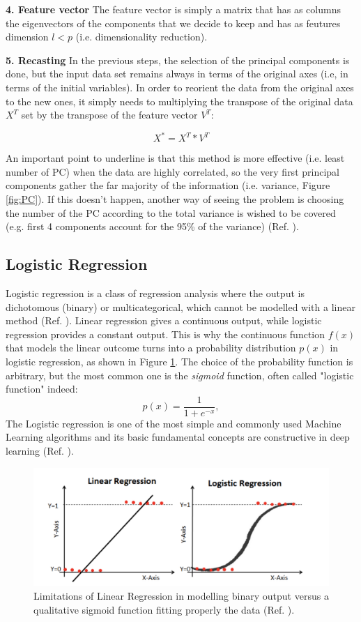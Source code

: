 \documentclass[english,notitlepage,reprint,nofootinbib]{revtex4-1}  %
\begin{document}
\textbf{4. Feature vector}
The feature vector is simply a matrix that has as columns the eigenvectors of the components that we decide to keep and has as feutures dimension $l < p$ (i.e. dimensionality reduction).

\textbf{5. Recasting}
In the previous steps, the selection of the principal components is done, but the input data set remains always in terms of the original axes (i.e, in terms of the initial variables). In order to reorient the data from the original axes to the new ones, it simply needs to multiplying the transpose of the original data $X^{T}$ set by the transpose of the feature vector $V^{T}$:

\begin{equation}
    X^{*} = X^{T} * V^{T}
\end{equation}

An important point to underline is that this method is more effective (i.e. least number of PC) when the data are highly correlated, so the very first principal components gather the far majority of the information (i.e. variance, Figure \ref{fig:PC}). If this doesn't happen, another way of seeing the problem is choosing the number of the PC according to the total variance is wished to be covered (e.g. first 4 components account for the 95\% of the variance) (Ref. \cite{pc2}).

\subsection{Logistic Regression}
Logistic regression is a class of regression analysis where the output is dichotomous (binary) or multicategorical, which cannot be modelled with a linear method (Ref. \cite{log1}). Linear regression gives a continuous output, while logistic regression provides a constant output. This is why the continuous function $f(x)$ that models the linear outcome turns into a probability distribution $p(x)$ in logistic regression, as shown in Figure \ref{fig:log}. The choice of the probability function is arbitrary, but the most common one is the \textit{sigmoid} function, often called "logistic function" indeed:
$$
p(x) = \frac{1}{1 + e^{-x}},
$$
The Logistic regression is one of the most simple and commonly used Machine Learning algorithms and its basic fundamental concepts are constructive in deep learning (Ref. \cite{log2}).

\begin{figure}[h]
    \centering 
    \includegraphics[scale=0.3]{img/Logistic_Regr.png}
    \caption{Limitations of Linear Regression in modelling binary output versus a qualitative sigmoid function fitting properly the data (Ref. \cite{log2}).}
    \label{fig:log}
\end{figure}
\end{document}
